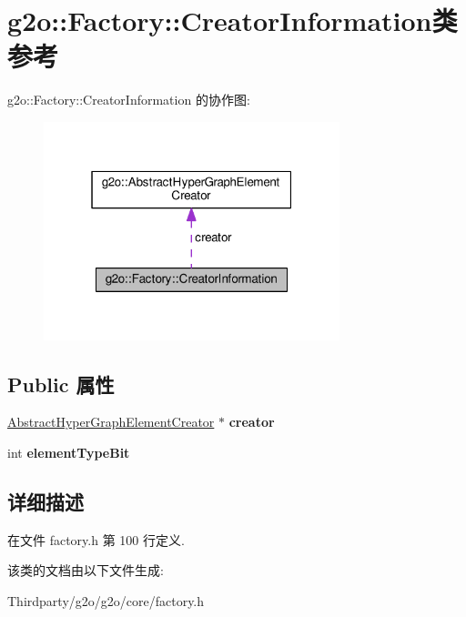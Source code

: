 \hypertarget{classg2o_1_1Factory_1_1CreatorInformation}{\section{g2o\-:\-:Factory\-:\-:Creator\-Information类 参考}
\label{classg2o_1_1Factory_1_1CreatorInformation}
}


g2o\-:\-:Factory\-:\-:Creator\-Information 的协作图\-:
\nopagebreak
\begin{figure}[H]
\begin{center}
\leavevmode
\includegraphics[width=244pt]{classg2o_1_1Factory_1_1CreatorInformation__coll__graph}
\end{center}
\end{figure}
\subsection*{Public 属性}
\begin{DoxyCompactItemize}
\item 
\hypertarget{classg2o_1_1Factory_1_1CreatorInformation_a9fd5a1087992c17f869f1d59bc519c23}{\hyperlink{classg2o_1_1AbstractHyperGraphElementCreator}{Abstract\-Hyper\-Graph\-Element\-Creator} $\ast$ {\bfseries creator}}\label{classg2o_1_1Factory_1_1CreatorInformation_a9fd5a1087992c17f869f1d59bc519c23}

\item 
\hypertarget{classg2o_1_1Factory_1_1CreatorInformation_ab9fa4c8aec27d204f5ae6a7510c4e339}{int {\bfseries element\-Type\-Bit}}\label{classg2o_1_1Factory_1_1CreatorInformation_ab9fa4c8aec27d204f5ae6a7510c4e339}

\end{DoxyCompactItemize}


\subsection{详细描述}


在文件 factory.\-h 第 100 行定义.



该类的文档由以下文件生成\-:\begin{DoxyCompactItemize}
\item 
Thirdparty/g2o/g2o/core/factory.\-h\end{DoxyCompactItemize}
